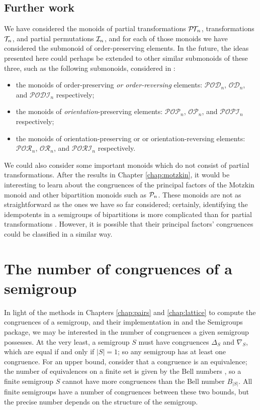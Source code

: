 \subsection{Further work}
\label{sec:princfact-further}
We have considered the monoids of partial transformations $\mathcal{P\!T\!}_n$,
transformations $\mathcal{T}_n$, and partial permutations $\mathcal{I}_n$, and for each of those
monoids we have considered the submonoid of order-preserving elements.  In the
future, the ideas presented here could perhaps be extended to other similar
submonoids of these three, such as the following submonoids, considered in
\cite[\S1.2]{wilf_ii}:

\begin{itemize}
\item the monoids of order-preserving \textit{or order-reversing} elements:
  $\mathcal{P\!O\!D\!}_n$, $\mathcal{O\!D\!}_n$, and $\mathcal{P\!O\!D\!I\!}_n$
  respectively;
\item the monoids of \textit{orientation}-preserving elements:
  $\mathcal{P\!O\!P\!}_n$, $\mathcal{O\!P\!}_n$, and $\mathcal{P\!O\!P\!I\!}_n$
  respectively;
\item the monoids of orientation-preserving or or orientation-reversing
  elements: $\mathcal{P\!O\!R\!}_n$, $\mathcal{O\!R\!}_n$, and
  $\mathcal{P\!O\!R\!I\!}_n$ respectively.
\end{itemize}

We could also consider some important monoids which do not consist of partial
transformations.  After the results in Chapter \ref{chap:motzkin}, it would be
interesting to learn about the congruences of the principal factors of the
Motzkin monoid and other bipartition monoids such as $\mathcal{P}_n$.  These monoids
are not as straightforward as the ones we have so far considered; certainly,
identifying the idempotents in a semigroups of bipartitions is more complicated
than for partial transformations \cite[Theorem 5]{pn_ids}.  However, it is
possible that their principal factors' congruences could be classified in a
similar way.



\section{The number of congruences of a semigroup}
\label{sec:nrcongs}

In light of the methods in Chapters \ref{chap:pairs} and \ref{chap:lattice} to
compute the congruences of a semigroup, and their implementation in
\libsemigroups{} and the Semigroups package, we may be interested in the
number of congruences a given semigroup possesses.  At the very least, a
semigroup $S$ must have congruences $\Delta_S$ and $\nabla_S$, which are equal
if and only if $|S| = 1$; so any semigroup has at least one congruence.  For an
upper bound, consider that a congruence is an equivalence; the number of
equivalences on a finite set is given by the Bell numbers , so
a finite semigroup $S$ cannot have more congruences than the Bell number
$B_{|S|}$.  All finite semigroups have a number of congruences between these two
bounds, but the precise number depends on the structure of the semigroup.

